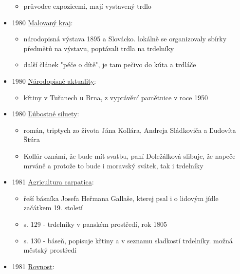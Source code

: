 \begin{itemize}
  \begin{itemize}
  \tightlist
  \item
    průvodce expozicemi, mají vystavený trdlo
  \end{itemize}
\item
  1980
  \href{https://ceskadigitalniknihovna.cz/uuid/uuid:79871740-f2ac-11e3-a2c6-005056827e51}{Malovaný
  kraj}:

  \begin{itemize}
  \tightlist
  \item
    národopisná výstava 1895 a Slovácko. lokálně se organizovaly sbírky
    předmětů na výstavu, poptávali trdla na trdelníky
  \item
    další článek "péče o dítě", je tam pečivo do kúta a trdláče
  \end{itemize}
\item
  1980
  \href{https://ceskadigitalniknihovna.cz/uuid/uuid:48f04200-3b6c-11e5-8b04-5ef3fc9bb22f}{Národopisné
  aktuality}:

  \begin{itemize}
  \tightlist
  \item
    křtiny v Tuřanech u Brna, z vyprávění pamětnice v roce 1950
  \end{itemize}
\item
  1980
  \href{https://dikda.snk.sk/uuid/uuid:1e4a583b-e745-48a1-a1af-55045e9c7694}{Ľúbostné
  siluety}:

  \begin{itemize}
  \tightlist
  \item
    román, triptych zo života Jána Kollára, Andreja Sládkoviča a
    Ľudovíta Štúra
  \item
    Kollár oznámí, že bude mít svatbu, paní Doležálková slibuje, že
    napeče mrváně a protože to bude i moravský svátek, tak i trdelníky
  \end{itemize}
\item
  1981
  \href{https://ndk.cz/uuid/uuid:6927e180-d0b8-11e6-8032-005056827e52}{Agricultura
  carpatica}:

  \begin{itemize}
  \tightlist
  \item
    řeší básníka Josefa Heřmana Gallaše, kterej psal i o lidovým jídle
    začátkem 19. století
  \item
    s. 129 - trdelníky v panském prostředí, rok 1805
  \item
    s. 130 - báseň, popisuje křtiny a v seznamu sladkostí trdelníky.
    možná městský prostředí
  \end{itemize}
\item
  1981
  \href{https://ceskadigitalniknihovna.cz/uuid/uuid:b1f3ed0d-b70a-4847-a4fe-baa804e675fc}{Rovnost}:


\end{itemize}
